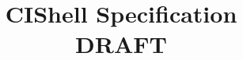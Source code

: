 \documentclass[pdftex,11pt,a4paper]{report}
\title{CIShell Specification \\
\textbf{DRAFT}}
\begin{document}
\maketitle{}
\tableofcontents{}






\orgcishellframework{}








\clearpage


\end{document}
